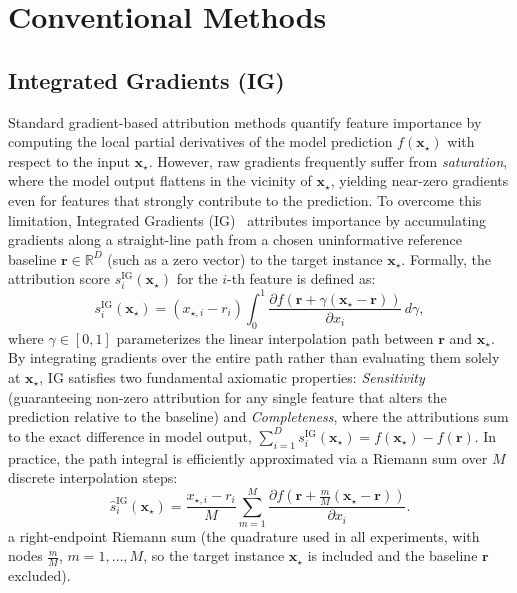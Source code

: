 \documentclass[pdflatex,sn-mathphys-num]{sn-jnl}
\theoremstyle{thmstyleone}
\theoremstyle{thmstyletwo}%
\theoremstyle{thmstylethree}%
\begin{document}
\section{Conventional Methods}\label{sec:conventional}

\subsection{Integrated Gradients (IG)}\label{sec:ig}
Standard gradient-based attribution methods quantify feature importance by computing the local partial derivatives of the model prediction $f(\mathbf{x}_\star)$ with respect to the input $\mathbf{x}_\star$. However, raw gradients frequently suffer from \emph{saturation}, where the model output flattens in the vicinity of $\mathbf{x}_\star$, yielding near-zero gradients even for features that strongly contribute to the prediction. To overcome this limitation, Integrated Gradients (IG)~\cite{sundararajan2017} attributes importance by accumulating gradients along a straight-line path from a chosen uninformative reference baseline $\mathbf{r} \in \mathbb{R}^D$ (such as a zero vector) to the target instance $\mathbf{x}_\star$. Formally, the attribution score $s_i^{\text{IG}}(\mathbf{x}_\star)$ for the $i$-th feature is defined as:
\begin{equation}
    s_i^{\text{IG}}(\mathbf{x}_\star) = (x_{\star, i} - r_i) \int_{0}^{1} \frac{\partial f(\mathbf{r} + \gamma(\mathbf{x}_\star - \mathbf{r}))}{\partial x_i} \, d\gamma,
\end{equation}
where $\gamma \in [0, 1]$ parameterizes the linear interpolation path between $\mathbf{r}$ and $\mathbf{x}_\star$. By integrating gradients over the entire path rather than evaluating them solely at $\mathbf{x}_\star$, IG satisfies two fundamental axiomatic properties: \emph{Sensitivity} (guaranteeing non-zero attribution for any single feature that alters the prediction relative to the baseline) and \emph{Completeness}, where the attributions sum to the exact difference in model output, $\sum_{i=1}^D s_i^{\text{IG}}(\mathbf{x}_\star) = f(\mathbf{x}_\star) - f(\mathbf{r})$. In practice, the path integral is efficiently approximated via a Riemann sum over $M$ discrete interpolation steps:
\begin{equation}
    \hat{s}_i^{\text{IG}}(\mathbf{x}_\star) = \frac{x_{\star, i} - r_i}{M} \sum_{m=1}^{M} \frac{\partial f\left(\mathbf{r} + \frac{m}{M}(\mathbf{x}_\star - \mathbf{r})\right)}{\partial x_i}.
\label{eq:ig_riemann}
\end{equation}
a right-endpoint Riemann sum (the quadrature used in all experiments, with nodes $\frac{m}{M}$, $m = 1, \dots, M$, so the target instance $\mathbf{x}_\star$ is included and the baseline $\mathbf{r}$ excluded).
\end{document}
